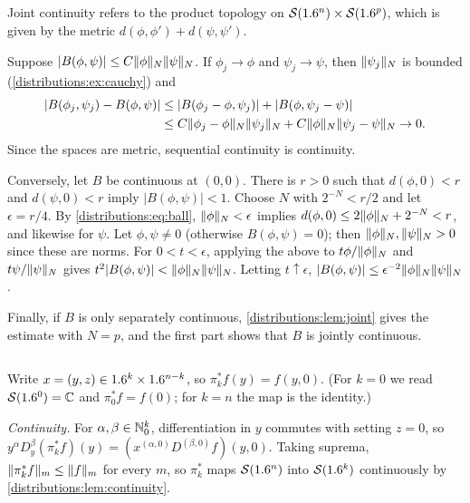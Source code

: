 \subsection*{}
Joint continuity refers to the product topology on $\mathcal{S}(1.6^n)\times\mathcal{S}(1.6^p)$, which is
given by the metric $d(\phi,\phi')+d(\psi,\psi')$.

Suppose $|B(\phi,\psi)|\le C\lVert \phi\rVert_N\lVert \psi\rVert_N$. If $\phi_j\to\phi$ and
$\psi_j\to\psi$, then $\lVert \psi_j\rVert_N$ is bounded (\cref{distributions:ex:cauchy}) and
\begin{align*}
  |B(\phi_j,\psi_j)-B(\phi,\psi)|&\le|B(\phi_j-\phi,\psi_j)|+|B(\phi,\psi_j-\psi)|\\
  &\le C\lVert \phi_j-\phi\rVert_N\lVert \psi_j\rVert_N+C\lVert \phi\rVert_N\lVert \psi_j-\psi\rVert_N\to0.
\end{align*}
Since the spaces are metric, sequential continuity is continuity.

Conversely, let $B$ be continuous at $(0,0)$. There is $r>0$ such that $d(\phi,0)<r$ and
$d(\psi,0)<r$ imply $|B(\phi,\psi)|<1$. Choose $N$ with $2^{-N}<r/2$ and let
$\epsilon=r/4$. By \eqref{distributions:eq:ball}, $\lVert \phi\rVert_N<\epsilon$ implies
$d(\phi,0)\le2\lVert \phi\rVert_N+2^{-N}<r$, and likewise for $\psi$. Let $\phi,\psi\ne0$
(otherwise $B(\phi,\psi)=0$); then $\lVert \phi\rVert_N,\lVert \psi\rVert_N>0$ since these are norms.
For $0<t<\epsilon$, applying the above to $t\phi/\lVert \phi\rVert_N$ and $t\psi/\lVert \psi\rVert_N$
gives $t^2|B(\phi,\psi)|<\lVert \phi\rVert_N\lVert \psi\rVert_N$. Letting $t\uparrow\epsilon$,
$|B(\phi,\psi)|\le\epsilon^{-2}\lVert \phi\rVert_N\lVert \psi\rVert_N$.

Finally, if $B$ is only separately continuous, \cref{distributions:lem:joint} gives the
estimate with $N=p$, and the first part shows that $B$ is jointly continuous.

\subsection*{}
Write $x=(y,z)\in1.6^k\times1.6^{n-k}$, so $\pi_k^*f(y)=f(y,0)$. (For $k=0$ we read
$\mathcal{S}(1.6^0)=\mathbb{C}$ and $\pi_0^*f=f(0)$; for $k=n$ the map is the identity.)

\emph{Continuity.} For $\alpha,\beta\in\mathbb{N}_0^k$, differentiation in $y$ commutes with
setting $z=0$, so $y^\alpha D_y^\beta(\pi_k^*f)(y)=(x^{(\alpha,0)}D^{(\beta,0)}f)(y,0)$.
Taking suprema, $\lVert \pi_k^*f\rVert_m\le\lVert f\rVert_m$ for every $m$, so $\pi_k^*$ maps
$\mathcal{S}(1.6^n)$ into $\mathcal{S}(1.6^k)$ continuously by \cref{distributions:lem:continuity}.

